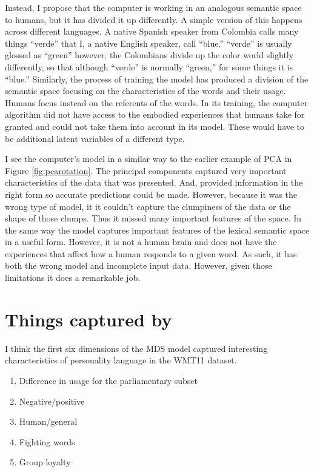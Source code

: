 Instead, I propose that the computer is working in an analogous semantic space
to humans, but it has divided it up differently. A simple version of this 
happens across different languages. A native Spanish speaker from Colombia calls 
many things
``verde'' that I, a native English speaker, call ``blue.'' ``verde'' is usually
glossed as ``green'' however, the Colombians divide up the color world slightly
differently, so that although ``verde'' is normally ``green,'' for some things
it is ``blue.'' Similarly, the process of training the \modelname{} model has
produced a division of the semantic space focusing on the characteristics of 
the words and their usage. Humans focus instead on the referents of the words.
In its training, the computer algorithm did not have access to the embodied
experiences that humans take for granted and could not take them into account
in its model. These would have to be additional latent variables of a different
type.

I see the computer's model in a similar way to the earlier example of PCA in 
Figure \ref{fig:pcarotation}. The principal components captured very important
characteristics of the data that was presented. And, provided information in 
the right 
form so accurate predictions could be made. However, because it was the wrong
type of model, it it couldn't capture the clumpiness of the data or the 
shape of those clumps. Thus it missed many important features of the space. In 
the same way
the \modelname{} model captures important features of the lexical semantic space
in a useful form. However, it is not a human brain and does not have the 
experiences that affect how a human responds to a given word. As such, it has
both the wrong model and incomplete input data. However, given those limitations
it does a remarkable job.

\section{Things captured by \modelname{}}

I think the first six dimensions of the MDS \modelname{} model captured
 interesting characteristics of personality language in the WMT11 dataset.
%
\begin{enumerate}
 \item Difference in usage for the parliamentary subset
 \item Negative/positive
 \item Human/general
 \item Fighting words
 \item Group loyalty
\end{enumerate}


